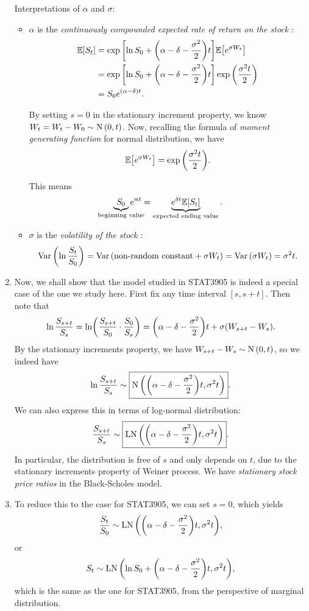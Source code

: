 \begin{enumerate}
Interpretations of \(\alpha\) and \(\sigma\):
\begin{itemize}
\item \(\alpha\) is the \emph{continuously compounded expected rate of return
on the stock }:
\begin{align*}
\mathbb{E}\qty[S_t]&=\exp\qty[\ln S_0+\qty(\alpha-\delta-\frac{\sigma^2}{2})t]\mathbb{E}\qty[e^{\sigma W_t}]\\
&=\exp\qty[\ln S_0+\qty(\alpha-\delta-\frac{\sigma^2}{2})t]\exp\qty(\frac{\sigma^2 t}{2})\\
&=S_0e^{(\alpha-\delta)t}.
\end{align*}
\begin{note}
By setting \(s=0\) in the stationary increment property, we know
\(W_t=W_t-W_0\sim \operatorname{N}\qty(0,t)\). Now, recalling the formula of \emph{moment
generating function} for normal distribution, we have
\[
\mathbb{E}\qty[e^{\sigma W_t}]=\exp\qty(\frac{\sigma^2 t}{2}).
\]
\end{note}

This means
\[
\underbrace{S_0}_{\mathclap{\text{beginning value}}}e^{\alpha t}
=\underbrace{e^{\delta t}\expv{S_t}}_{\text{expected ending value}}.
\]
\item \(\sigma\) is the \emph{volatility of the stock }:
\[
\operatorname{Var}\qty(\ln\frac{S_t}{S_0})
=\operatorname{Var}\qty(\text{non-random constant}+\sigma W_t)
=\operatorname{Var}\qty(\sigma W_t)
=\sigma^2t.
\]
\end{itemize}
\item \label{it:stock-price-ratio-dist} Now, we shall show that the model studied in STAT3905 is indeed a special
case of the one we study here. First fix any time interval \([s,s+t]\).  Then
note that
\[
\ln\frac{S_{s+t}}{S_s}=\ln(\frac{S_{s+t}}{S_0}\cdot\frac{S_0}{S_s})
=\qty(\alpha-\delta-\frac{\sigma^2}{2})t+\sigma(W_{s+t}-W_s).
\]
By the stationary increments property, we have \(W_{s+t}-W_{s}\sim \operatorname{N}\qty(0,t)\), so
we indeed have
\[
\ln\frac{S_{s+t}}{S_s}\sim \boxed{\operatorname{N}\qty(\qty(\alpha-\delta-\frac{\sigma^2}{2})t,\sigma^{2}t)}.
\]
We can also express this in terms of log-normal distribution:
\[
\frac{S_{s+t}}{S_s}\sim \boxed{\operatorname{LN}\qty(\qty(\alpha-\delta-\frac{\sigma^2}{2})t,\sigma^{2}t)}.
\]
In particular, the distribution is free of \(s\) and only depends on \(t\), due
to the stationary increments property of Weiner process. We have
\emph{stationary stock price ratios} in the Black-Scholes model.

\item To reduce this to the case for STAT3905, we can set \(s=0\), which yields
\[
\frac{S_{t}}{S_0}\sim \operatorname{LN}\qty(\qty(\alpha-\delta-\frac{\sigma^2}{2})t,\sigma^{2}t),
\]
or
\[
S_t\sim \operatorname{LN}\qty(\ln S_0+\qty(\alpha-\delta-\frac{\sigma^2}{2})t,\sigma^{2}t),
\]
which is the same as the one for STAT3905, from the perspective of marginal
distribution.


\end{enumerate}
